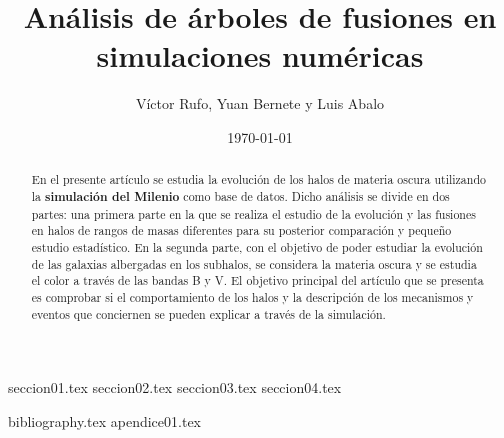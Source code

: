 \documentclass[a4paper, amsfonts, amssymb, amsmath, reprint, showkeys, nofootinbib, twoside]{revtex4-1}
\begin{document}
\renewcommand{\tablename}{\textit{Tabla}}
\renewcommand{\figurename}{\textit{Figura}}

\title{Análisis de árboles de fusiones en simulaciones numéricas}

\author{Víctor Rufo, Yuan Bernete y Luis Abalo}

\date{\today} %

\begin{abstract}
En el presente artículo se estudia la evolución de los halos de materia oscura utilizando la \textbf{simulación del Milenio} como base de datos. Dicho análisis se divide en dos partes: una primera parte en la que se realiza el estudio de la evolución y las fusiones en halos de rangos de masas diferentes para su posterior comparación y pequeño estudio estadístico. En la segunda parte, con el objetivo de poder estudiar la evolución de las galaxias albergadas en los subhalos, se considera la materia oscura y se estudia el color a través de las bandas B y V. El objetivo principal del artículo que se presenta es comprobar si el comportamiento de los halos y la descripción de los mecanismos y eventos que conciernen se pueden explicar a través de la simulación.

\end{abstract}


\maketitle


{seccion01.tex} 
{seccion02.tex}
{seccion03.tex}
{seccion04.tex}

{bibliography.tex}
\newpage
{apendice01.tex}
\end{document}
